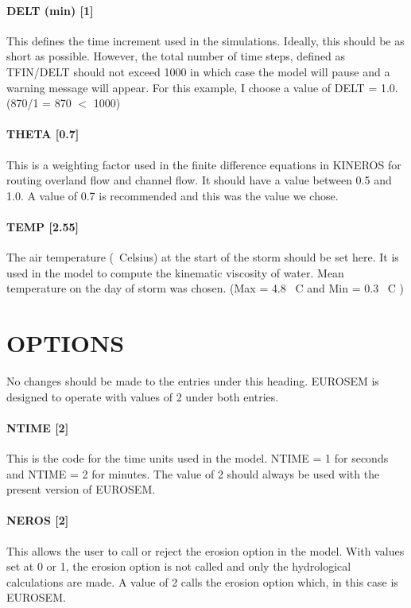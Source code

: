 \paragraph{DELT (min) [1]}
This defines the time increment used in the simulations. Ideally, this should be as short as possible. However, the total number of time steps, defined as TFIN/DELT should not exceed 1000 in which case the model will pause and a warning message will appear. For this example, I choose a value of DELT = 1.0. (870/1 = 870 $<$ 1000)
 
\paragraph{THETA [0.7]}
This is a weighting factor used in the finite difference equations in KINEROS for routing overland flow and channel flow. It should have a value between 0.5 and 1.0. A value of 0.7 is recommended and this was the value we chose.
 
\paragraph{TEMP [2.55]}
The air temperature (\textdegree\ Celsius) at the start of the storm should be set here. It is used in the model to compute the kinematic viscosity of water. Mean temperature on the day of storm was chosen. (Max = 4.8 \textdegree\ C and Min = 0.3 \textdegree\ C )
 
\section{OPTIONS}
\label{sec:OPTIONS}

No changes should be made to the entries under this heading.
EUROSEM is designed to operate with values of 2 under both entries.
 
\paragraph{NTIME [2]}
This is the code for the time units used in the model. NTIME = 1 for seconds and NTIME = 2 for minutes. The value of 2 should always be used with the present version of EUROSEM.
 
\paragraph{NEROS [2]}
This allows the user to call or reject the erosion option in the model. With values set at 0 or 1, the erosion option is not called and only the hydrological calculations are made. A value of 2 calls the erosion option which, in this case is EUROSEM.
 
